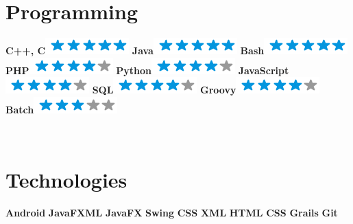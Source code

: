\begin{aside}
  \section{Programming}
    \textbf{C++, C}\includegraphics[scale=0.40]{img/5stars.png}
    \textbf{Java}\includegraphics[scale=0.40]{img/5stars.png}
    \textbf{Bash}\includegraphics[scale=0.40]{img/5stars.png}
    \textbf{PHP}\includegraphics[scale=0.40]{img/4stars.png}
    \textbf{Python}\includegraphics[scale=0.40]{img/4stars.png}
    \textbf{JavaScript}\includegraphics[scale=0.40]{img/4stars.png}
    \textbf{SQL}\includegraphics[scale=0.40]{img/4stars.png}
    \textbf{Groovy}\includegraphics[scale=0.40]{img/4stars.png}
    \textbf{Batch}\includegraphics[scale=0.40]{img/3stars.png}
    
    ~
 \section{Technologies}
   \textbf{Android}
   \textbf{JavaFXML}
   \textbf{JavaFX}
   \textbf{Swing}
   \textbf{CSS}
   \textbf{XML}
   \textbf{HTML}
   \textbf{CSS}
   \textbf{Grails} 
   \textbf{Git}
\end{aside}

